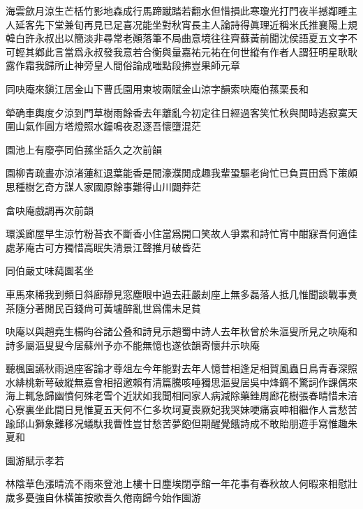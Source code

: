 \documentclass{zhvt-classic-Miya}
\begin{document}
海雲歛月涼生芒栝竹影地森成行馬蹄蹴踏若翻水但惜損此寒瓊光打門夜半撼鄰睡主人延客先下堂兼旬再見已足喜况能坐對秋宵長主人論詩得眞理近稱米氏推襄陽上規韓白許永叔出以簡淡非尋常老顚落筆不局曲意境往往齊蘇黃前聞沈侯語夏五文字不可輕其鄕此言當爲永叔發我意若合衡與量嘉祐元祐在何世縱有作者人謂狂明星耿耿露作霜我歸所止神旁皇人間俗論成嗤點段拂豈果師元章

\begin{fw}同吷庵來鎭江居金山下曹氏園用東坡兩賦金山涼字韻索吷庵伯蓀栗長和\end{fw}

犖确車輿度夕涼到門草樹雨餘香去年離亂今初定往日經過客笑忙秋與閒時逃寂寞天圍山氣作圓方塔燈照水鐘鳴夜忍逐吾懷墮混茫

\begin{fw}園池上有廢亭同伯蓀坐話久之次前韻\end{fw}

園柳青疏晝亦涼渚蓮紅退葉能香是間濠濮閒成趣我輩蛩驅老尙忙已負買田爲下策頗思種樹乞奇方謀人家國原餘事難得山川闢莽茫

\begin{fw}畣吷庵戲調再次前韻\end{fw}

環溪廊屋早生涼竹粉苔衣不斷香小住當爲開口笑故人爭累和詩忙宵中酣寐吾何適佳處茅庵古可方獨惜高眠失清景江聲推月破昏茫

\begin{fw}同伯嚴丈味蒓園茗坐\end{fw}

車馬來稀我到頻日斜廊靜見窓塵眼中過去莊嚴刦座上無多磊落人抵几惟聞談戰事煑茶隨分著閒民百錢尙可黃壚醉亂世爲儒未足貧

\begin{fw}吷庵以與趙堯生楊昀谷諸公叠和詩見示趙蜀中詩人去年秋曾於朱漚叟所見之吷庵和詩多屬漚叟叟今居蘇州予亦不能無憶也遂依韻寄懷幷示吷庵\end{fw}

聽楓園讌秋雨過座客論才尊俎左今年能對去年人憶昔相逢足相賀風蟲日鳥青春深照水緋桃新萼破縱無嘉會相招邀賴有清篇騰咳唾獨思漚叟居吳中烽鏑不驚詞作課偶來海上輒急歸幽憤何殊老雪个近狀如我聞相同家人病減除藥銼周廊花樹張春晴惜未涪心寮裏坐此間日見惟夏五天何不仁多坎坷夏喪厥妃我哭妹哽痛哀呻相繼作人言愁苦踰邱山獅象難移况蟻馱我曹性豈甘愁苦夢飽但期醒覺餓詩成不敢貽朋遊手寫惟趣朱夏和

\begin{fw}園游賦示孝若\end{fw}

林陰草色漲晴流不雨來登池上樓十日塵埃閉亭館一年花事有春秋故人何暇來相慰壯歲多憂強自休橫笛按歌吾久倦南歸今始作園游
\end{document}
